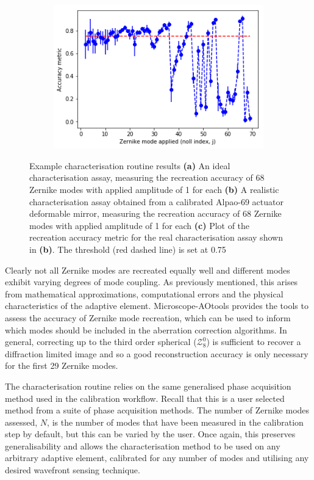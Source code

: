 \begin{figure}[h]
	\begin{subfigure}{0.9\textwidth}
		\centering
		\includegraphics[width=0.6\linewidth, scale=0.5]{./images/real_characterisation_assay_plot_metric_errorbar.png}
		\caption{}
		\label{fig:real_characterisation_assay_plot_metric_errorbar}
	\end{subfigure}
	\caption[Example characterisation routine results]{Example characterisation routine results \textbf{(a)} An ideal characterisation assay, measuring the recreation accuracy of 68 Zernike modes with applied amplitude of 1 for each \textbf{(b)} A realistic characterisation assay obtained from a calibrated Alpao-69 actuator deformable mirror, measuring the recreation accuracy of 68 Zernike modes with applied amplitude of 1 for each \textbf{(c)} Plot of the recreation accuracy metric for the real characterisation assay shown in \textbf{(b)}. The threshold (red dashed line) is set at 0.75}
	\label{fig:characterisation_assay_results}
\end{figure}

Clearly not all Zernike modes are recreated equally well and  different modes exhibit varying degrees of mode coupling. As previously mentioned, this arises from mathematical approximations,
computational errors and the physical characteristics of the adaptive element. Microscope-AOtools provides the tools to assess the accuracy of Zernike mode recreation, which can be used to inform which modes should be included in the aberration correction algorithms. In general, correcting up to the third order spherical ($\mathcal{Z}_{8}^{0}$) is sufficient to recover a diffraction limited image and so a good reconstruction accuracy is only necessary for the first 29 Zernike modes\cite{antonello2014optimisation}.

The characterisation routine relies on the same generalised phase acquisition method used in the calibration workflow. Recall that this is a user selected method from a suite of phase acquisition methods. The number of Zernike modes assessed, $N$, is the number of modes that have been measured in the calibration step by default, but this can be varied by the user. Once again, this preserves generalisability and allows the characterisation method to be used on any arbitrary adaptive element, calibrated for any number of modes and utilising any desired wavefront sensing technique.

